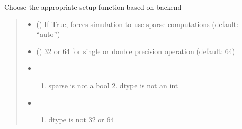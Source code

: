 \documentclass[letterpaper,10pt,english]{sphinxmanual}
\begin{document}
\begin{fulllineitems}
\begin{fulllineitems}
\begin{quote}
\begin{description}
\end{description}\end{quote}

\end{fulllineitems}


\begin{fulllineitems}
\label{\detokenize{index:id4}}
\pysigstartsignatures
\pysiglinewithargsret
{}
{\sphinxparamcomma {}}
{}
\pysigstopsignatures
\sphinxAtStartPar
Choose the appropriate setup function based on backend
\begin{quote}\begin{description}
\begin{itemize}
\item {} 
\sphinxAtStartPar
{} () \textendash{} If True, forces simulation to use sparse computations (default: “auto”)

\item {} 
\sphinxAtStartPar
{} () \textendash{} 32 or 64 for single or double precision operation (default: 64)

\end{itemize}

\begin{itemize}
\item {} 
\sphinxAtStartPar
{} \textendash{} \begin{enumerate}
%
\item {} 
\sphinxAtStartPar
sparse is not a bool
    2. dtype is not an int

\end{enumerate}


\item {} 
\sphinxAtStartPar
{} \textendash{} \begin{enumerate}
%
\item {} 
\sphinxAtStartPar
dtype is not 32 or 64


\end{enumerate}
\end{itemize}
\end{description}
\end{quote}
\end{fulllineitems}
\end{fulllineitems}
\end{document}
